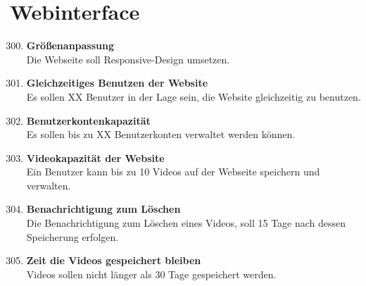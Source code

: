 \section{Webinterface}
\begin{enumerate}[\bfseries{NA}10]
\setcounter{enumi}{299}

\item \textbf{Größenanpassung} \hfill\\  Die Webseite soll Responsive-Design umsetzen.

\item \textbf{Gleichzeitiges Benutzen der Website} \hfill\\  Es sollen XX Benutzer in der Lage sein, die Website gleichzeitig zu benutzen.

\item \textbf{Benutzerkontenkapazität} \hfill\\  Es sollen bis zu XX Benutzerkonten verwaltet werden können.

\item \textbf{Videokapazität der Website} \hfill\\  Ein Benutzer kann bis zu 10 Videos auf der Webseite speichern und verwalten.

\item \textbf{Benachrichtigung zum Löschen} \hfill\\  Die Benachrichtigung zum Löschen eines Videos, soll 15 Tage nach dessen Speicherung erfolgen.

\item \textbf{Zeit die Videos gespeichert bleiben} \hfill\\  Videos sollen nicht länger als 30 Tage gespeichert werden.
\end{enumerate}





